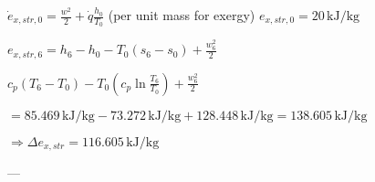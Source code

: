 \( \dot{e}_{x,str,0} = \frac{w^2}{2} + \dot{q} \frac{h_0}{T_0} \) (per unit mass for exergy)  
\( e_{x,str,0} = 20 \, \text{kJ/kg} \)  

\( e_{x,str,6} = h_6 - h_0 - T_0 (s_6 - s_0) + \frac{w_6^2}{2} \)  

\( c_p (T_6 - T_0) - T_0 \left( c_p \ln \frac{T_6}{T_0} \right) + \frac{w_6^2}{2} \)  

\( = 85.469 \, \text{kJ/kg} - 73.272 \, \text{kJ/kg} + 128.448 \, \text{kJ/kg} = 138.605 \, \text{kJ/kg} \)  

\( \Rightarrow \Delta e_{x,str} = 116.605 \, \text{kJ/kg} \)  

---